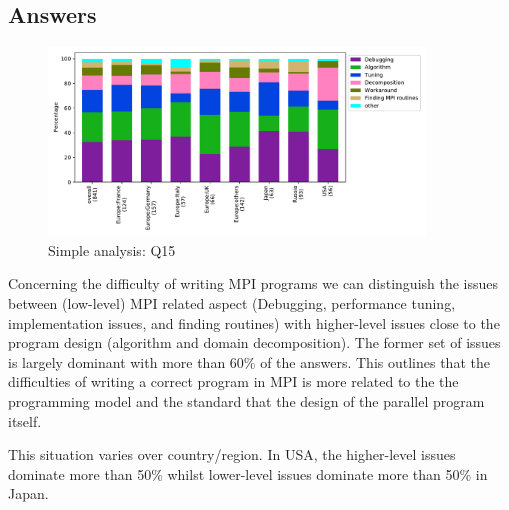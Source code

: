 
\subsection{Answers}


\begin{figure}[htb]
\begin{center}
\includegraphics[width=10cm]{../pdfs/Q15.pdf}
\caption{Simple analysis: Q15}
\label{fig:Q15}
\end{center}
\end{figure}

Concerning the difficulty of writing MPI programs we can distinguish the issues
between (low-level) MPI related aspect (Debugging, performance tuning,
implementation issues, and finding routines) with higher-level issues close to
the program design (algorithm and domain decomposition). The former set of
issues is largely dominant with more than 60\% of the answers. This outlines
that the difficulties of writing a correct program in MPI is more related to the
the programming model and the standard that the design of the parallel program itself. 

This situation varies over country/region. In USA, the higher-level
issues dominate more than 50\% whilst lower-level issues dominate more
than 50\% in Japan. 